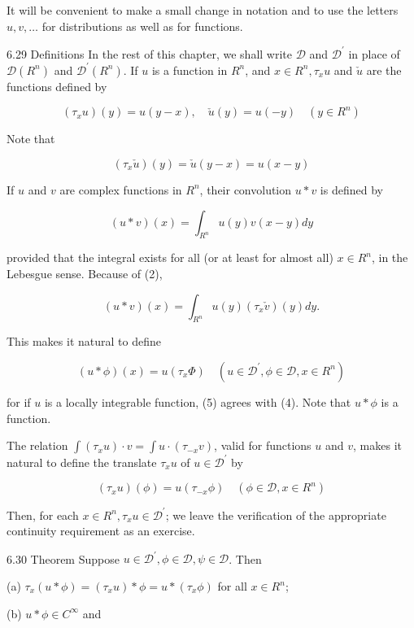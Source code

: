 \documentclass[10pt]{article}
\begin{document}
It will be convenient to make a small change in notation and to use the letters $u, v, \ldots$ for distributions as well as for functions.

6.29 Definitions In the rest of this chapter, we shall write $\mathscr{D}$ and $\mathscr{D}^{\prime}$ in place of $\mathscr{D}\left(R^{n}\right)$ and $\mathscr{D}^{\prime}\left(R^{n}\right)$. If $u$ is a function in $R^{n}$, and $x \in R^{n}, \tau_{x} u$ and $\check{u}$ are the functions defined by

$$
\left(\tau_{x} u\right)(y)=u(y-x), \quad \check{u}(y)=u(-y) \quad\left(y \in R^{n}\right)
$$

Note that

$$
\left(\tau_{x} \check{u}\right)(y)=\check{u}(y-x)=u(x-y)
$$

If $u$ and $v$ are complex functions in $R^{n}$, their convolution $u * v$ is defined by

$$
(u * v)(x)=\int_{R^{n}} u(y) v(x-y) d y
$$

provided that the integral exists for all (or at least for almost all) $x \in R^{n}$, in the Lebesgue sense. Because of (2),

$$
(u * v)(x)=\int_{R^{n}} u(y)\left(\tau_{x} \check{v}\right)(y) d y .
$$

This makes it natural to define

$$
(u * \phi)(x)=u\left(\tau_{x} \Phi\right) \quad\left(u \in \mathscr{D}^{\prime}, \phi \in \mathscr{D}, x \in R^{n}\right)
$$

for if $u$ is a locally integrable function, (5) agrees with (4). Note that $u * \phi$ is a function.

The relation $\int\left(\tau_{x} u\right) \cdot v=\int u \cdot\left(\tau_{-x} v\right)$, valid for functions $u$ and $v$, makes it natural to define the translate $\tau_{x} u$ of $u \in \mathscr{D}^{\prime}$ by

$$
\left(\tau_{x} u\right)(\phi)=u\left(\tau_{-x} \phi\right) \quad\left(\phi \in \mathscr{D}, x \in R^{n}\right)
$$

Then, for each $x \in R^{n}, \tau_{x} u \in \mathscr{D}^{\prime}$; we leave the verification of the appropriate continuity requirement as an exercise.

6.30 Theorem Suppose $u \in \mathscr{D}^{\prime}, \phi \in \mathscr{D}, \psi \in \mathscr{D}$. Then

(a) $\tau_{x}(u * \phi)=\left(\tau_{x} u\right) * \phi=u *\left(\tau_{x} \phi\right)$ for all $x \in R^{n}$;

(b) $u * \phi \in C^{\infty}$ and
\end{document}
